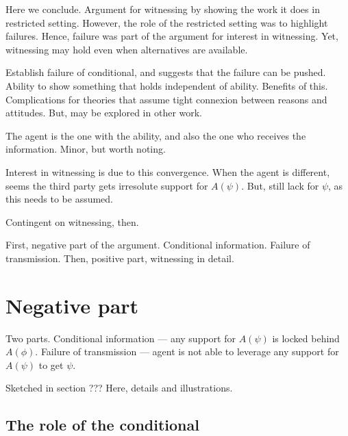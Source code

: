 \documentclass[10pt]{article}
\newcommand{\hozlinedash}[0]{%
  \noindent\hdashrule[0.5ex][c]{\textwidth}{.1pt}{2.5pt}
}
\begin{document}
\begin{note}
  Here we conclude.
  Argument for witnessing by showing the work it does in restricted setting.
  However, the role of the restricted setting was to highlight failures.
  Hence, failure was part of the argument for interest in witnessing.
  Yet, witnessing may hold even when alternatives are available.

  Establish failure of conditional, and suggests that the failure can be pushed.
  Ability to show something that holds independent of ability.
  Benefits of this.
  Complications for theories that assume tight connexion between reasons and attitudes.
  But, may be explored in other work.
\end{note}

\begin{note}
  The agent is the one with the ability, and also the one who receives the information.
  Minor, but worth noting.

  Interest in witnessing is due to this convergence.
  When the agent is different, seems the third party gets irresolute support for \(A(\psi)\).
  But, still lack for \(\psi\), as this needs to be assumed.

  Contingent on witnessing, then.
\end{note}

\begin{note}[Outline]
  First, negative part of the argument.
  Conditional information.
  Failure of transmission.
  Then, positive part, witnessing in detail.
\end{note}

\hozlinedash

\section{Negative part}
\label{sec:negative-part}

Two parts.
Conditional information --- any support for \(A(\psi)\) is locked behind \(A(\phi)\).
Failure of transmission --- agent is not able to leverage any support for \(A(\psi)\) to get \(\psi\).

Sketched in {\color{red} section ???}
Here, details and illustrations.

\subsection{The role of the conditional}
\label{sec:role-conditional}
\end{document}
